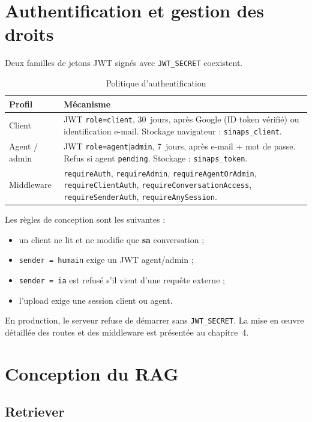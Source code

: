 \section{Authentification et gestion des droits}

Deux familles de jetons JWT signés avec \texttt{JWT\_SECRET} coexistent.

\begin{table}[H]
\centering
\caption{Politique d'authentification}
\label{tab:auth}
\small
\begin{tabularx}{\textwidth}{|l|X|}
\hline
Profil & Mécanisme \\
\hline
Client & JWT \texttt{role=client}, 30~jours, après Google (ID token vérifié) ou identification e-mail. Stockage navigateur : \texttt{sinaps\_client}. \\
\hline
Agent / admin & JWT \texttt{role=agent$\mid$admin}, 7~jours, après e-mail + mot de passe. Refus si agent \texttt{pending}. Stockage : \texttt{sinaps\_token}. \\
\hline
Middleware & \texttt{requireAuth}, \texttt{requireAdmin}, \texttt{requireAgentOrAdmin}, \texttt{requireClientAuth}, \texttt{requireConversationAccess}, \texttt{requireSenderAuth}, \texttt{requireAnySession}. \\
\hline
\end{tabularx}
\end{table}

Les règles de conception sont les suivantes :

\begin{itemize}[leftmargin=1.4em]
  \item un client ne lit et ne modifie que \textbf{sa} conversation ;
  \item \texttt{sender = humain} exige un JWT agent/admin ;
  \item \texttt{sender = ia} est refusé s'il vient d'une requête externe ;
  \item l'upload exige une session client ou agent.
\end{itemize}

En production, le serveur refuse de démarrer sans \texttt{JWT\_SECRET}. La mise en œuvre détaillée des routes et des middleware est présentée au chapitre~4.

\section{Conception du RAG}

\subsection{Retriever}

